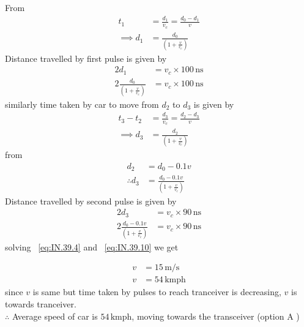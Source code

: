 \documentclass[journal,12pt,onecolumn]{IEEEtran}
\theoremstyle{remark}
\begin{document}
From ~
\begin{align}
    t_1&=\frac{d_1}{v_c}=\frac{d_0-d_1}{v}\\
\implies d_1&=\frac{d_0}{\left(1+\frac{v}{v_c}\right)}
\end{align}
Distance travelled by first pulse is given by 
\begin{align}
    2d_1 &= v_c \times 100 \, \text{ns}\\
    2\frac{d_0}{\left(1+\frac{v}{v_c}\right)}&=v_c \times 100 \, \text{ns}
    \label{eq:IN.39.4}
\end{align}
similarly time taken by car to move from $d_2$ to $d_3$ is given by
\begin{align}
    t_3-t_2&=\frac{d_3}{v_c}=\frac{d_2-d_3}{v}\\
    \implies d_3&=\frac{d_2}{\left(1+\frac{v}{v_c}\right)}
\end{align}
from ~
\begin{align}
    d_2&=d_0-0.1v\\
\therefore d_3&=\frac{d_0-0.1v}{\left(1+\frac{v}{v_c}\right)}
\end{align}
Distance travelled by second pulse is given by 
\begin{align}
    2d_3 &= v_c \times 90 \, \text{ns}\\
    2\frac{d_0-0.1v}{\left(1+\frac{v}{v_c}\right)}&= v_c \times 90 \, \text{ns} \label{eq:IN.39.10}
\end{align}
solving ~\eqref{eq:IN.39.4} and ~\eqref{eq:IN.39.10} we get

\begin{align}
    v &= 15\, \text{m/s} \\
    v &=54\, \text{kmph}
\end{align}
since $v$ is same but time taken by pulses to reach tranceiver is decreasing, $v$ is towards tranceiver.\\
$\therefore$ Average speed of car is $54\,\text{kmph}$, moving towards the transceiver (option A )
\end{document}
